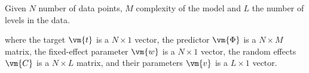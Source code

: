 \documentclass[a4paper,10pt]{article}
\begin{document}
Given $N$ number of data points, $M$ complexity of the model and $L$ the number of levels in the data.

where the target $\vm{t}$ is a $N \times 1$ vector, the predictor $\vm{\Phi}$ is a $N \times M$ matrix, the fixed-effect parameter $\vm{w}$ is a $N \times 1$ vector, the random effects $\vm{C}$ is a $N \times L$ matrix, and their parameters $\vm{v}$ is a $L \times 1$ vector.






 {\footnotesize
 
 
 }
\end{document}
